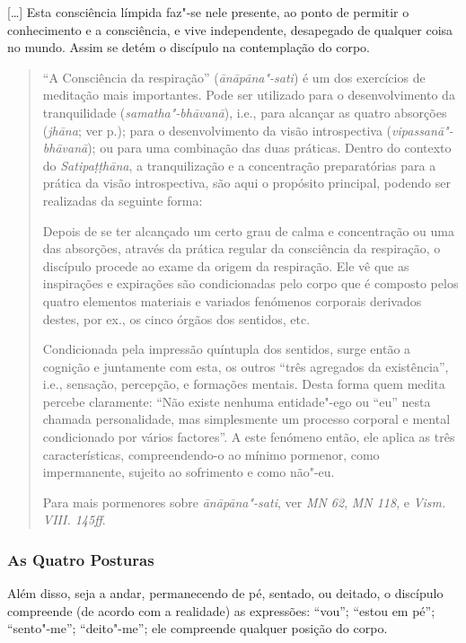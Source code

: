 [\ldots] Esta consciência límpida faz"-se nele presente, ao ponto de permitir o
conhecimento e a consciência, e vive independente, desapegado de qualquer coisa
no mundo. Assim se detém o discípulo na contemplação do corpo.


\begin{quote}
  “A Consciência da respiração” (\emph{ānāpāna"-sati}) é um dos exercícios de
  meditação mais importantes. Pode ser utilizado para o desenvolvimento da
  tranquilidade (\emph{samatha"-bhāvanā}), i.e., para alcançar as quatro
  absorções (\emph{jhāna}; ver p.\pageref{jhana}); para o
  desenvolvimento da visão introspectiva (\emph{vipassanā"-bhāvanā}); ou para uma
  combinação das duas práticas. Dentro do contexto do
  \emph{Satipa\d{t}\d{t}hāna}, a tranquilização e a concentração preparatórias
  para a prática da visão introspectiva, são aqui o propósito principal, podendo
  ser realizadas da seguinte forma:

  Depois de se ter alcançado um certo grau de calma e concentração ou uma das
  absorções, através da prática regular da consciência da respiração, o
  discípulo procede ao exame da origem da respiração. Ele vê que as inspirações
  e expirações são condicionadas pelo corpo que é composto pelos quatro
  elementos materiais e variados fenómenos corporais derivados destes, por ex.,
  os cinco órgãos dos sentidos, etc.

  Condicionada pela impressão quíntupla dos sentidos, surge então a cognição e
  juntamente com esta, os outros “três agregados da existência”, i.e.,
  sensação, percepção, e formações mentais. Desta forma quem medita percebe
  claramente: “Não existe nenhuma entidade"-ego ou “eu” nesta chamada
  personalidade, mas simplesmente um processo corporal e mental condicionado por
  vários factores”. A este fenómeno então, ele aplica as três características,
  compreendendo-o ao mínimo pormenor, como impermanente, sujeito ao sofrimento e
  como não"-eu.

  Para mais pormenores sobre \emph{ānāpāna"-sati}, ver \emph{MN 62}, \emph{MN
    118}, e \emph{Vism. VIII. 145ff}.
\end{quote}

\clearpage

\subsubsection{As Quatro Posturas}

Além disso, seja a andar, permanecendo de pé, sentado, ou deitado, o discípulo
compreende (de acordo com a realidade) as expressões: “vou”; “estou em pé”;
“sento"-me”; “deito"-me”; ele compreende qualquer posição do corpo.

